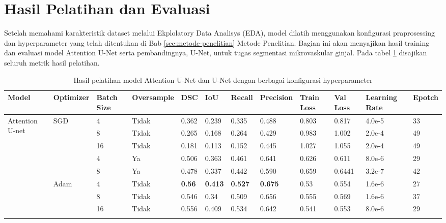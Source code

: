 \section{Hasil Pelatihan dan Evaluasi}
\noindent Setelah memahami karakteristik dataset melalui Ekplolatory Data Analisys (EDA), model dilatih menggunakan konfigurasi praprosessing dan hyperparameter yang telah ditentukan di Bab \ref{sec:metode-penelitian} Metode Penelitian. Bagian ini akan menyajikan hasil training dan evaluasi model Attention U-Net serta pembandingnya, U-Net, untuk tugas segmentasi mikrovaskular ginjal. Pada tabel \ref{tab:training-results} disajikan seluruh metrik hasil pelatihan.

\begin{landscape}
	\begin{table}[]
		\caption{Hasil pelatihan model Attention U-Net dan U-Net dengan berbagai konfigurasi hyperparameter}
		\label{tab:training-results}
		\begin{tabular}{@{}llllllllllll@{}}
			\toprule
			Model &
			Optimizer &
			Batch Size &
			Oversample &
			DSC &
			IoU &
			Recall &
			Precision &
			Train Loss &
			Val Loss &
			Learning Rate &
			Epotch \\ \midrule
			\multirow{10}{*}{Attention U-net} &
			\multirow{5}{*}{SGD} &
			4 &
			Tidak &
			0.362 &
			0.239 &
			0.335 &
			0.488 &
			0.803 &
			0.817 &
			4.0e-5 &
			33 \\
			&  & 8  & Tidak & 0.265          & 0.168          & 0.264          & 0.429          & 0.983 & 1.002  & 2.0e-4 & 49 \\
			&  & 16 & Tidak & 0.181          & 0.113          & 0.152          & 0.445          & 1.027 & 1.055  & 2.0e-4 & 49 \\ \cmidrule(l){3-12} 
			&  & 4  & Ya    & 0.506          & 0.363          & 0.461          & 0.641          & 0.626 & 0.611  & 8.0e-6 & 29 \\
			&  & 8  & Ya    & 0.478          & 0.337          & 0.442          & 0.590          & 0.659 & 0.6441 & 3.2e-7 & 42 \\ \cmidrule(l){2-12} 
			&
			\multirow{5}{*}{Adam} &
			4 &
			Tidak &
			\textbf{0.56} &
			\textbf{0.413} &
			\textbf{0.527} &
			\textbf{0.675} &
			0.53 &
			0.554 &
			1.6e-6 &
			27 \\
			&  & 8  & Tidak & 0.546          & 0.34           & 0.509          & 0.656          & 0.555 & 0.569  & 1.6e-6 & 37 \\
			&  & 16 & Tidak & 0.556          & 0.409          & 0.534          & 0.642          & 0.541 & 0.553  & 8.0e-6 & 29 \\ \cmidrule(l){3-12} 

\end{tabular}
\end{table}
\end{landscape}
